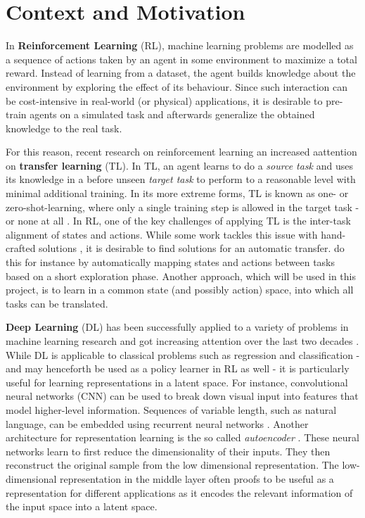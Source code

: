 \section{Context and Motivation}
\label{sec:context}

In \textbf{Reinforcement Learning} (RL), machine learning problems are modelled as a sequence of actions taken by an agent in some environment to maximize a total reward. Instead of learning from a dataset, the agent builds knowledge about the environment by exploring the effect of its behaviour. Since such interaction can be cost-intensive in real-world (or physical) applications, it is desirable to pre-train agents on a simulated task and afterwards generalize the obtained knowledge to the real task. 

For this reason, recent research on reinforcement learning an increased aattention on \textbf{transfer learning} (TL). In TL, an agent learns to do a \textit{source task} and uses its knowledge in a before unseen \textit{target task} to perform to a reasonable level with minimal additional training. In its more extreme forms, TL is known as one- or zero-shot-learning, where only a single training step is allowed in the target task - or none at all \citep{goodfellow2016deep}. In RL, one of the key challenges of applying TL is the inter-task alignment of states and actions. While some work tackles this issue with hand-crafted solutions \citep[e.g.][]{taylor2007cross}, it is desirable to find solutions for an automatic transfer. \citep{taylor2008autonomous} do this for instance by automatically mapping states and actions between tasks based on a short exploration phase. Another approach, which will be used in this project, is to learn in a common state (and possibly action) space, into which all tasks can be translated.

\textbf{Deep Learning} (DL) has been successfully applied to a variety of problems in machine learning research and got increasing attention over the last two decades \citep{goodfellow2016deep}. While DL is applicable to classical problems such as regression and classification - and may henceforth be used as a policy learner in RL as well - it is particularly useful for learning representations in a latent space. For instance, convolutional neural networks (CNN) can be used to break down visual input into features that model higher-level information. Sequences of variable length, such as natural language, can be embedded using recurrent neural networks \citep{goldberg2017neural}. Another architecture for representation learning is the so called \textit{autoencoder} \citep{hinton2006reducing}. These neural networks learn to first reduce the dimensionality of their inputs. They then reconstruct the original sample from the low dimensional representation. The low-dimensional representation in the middle layer often proofs to be useful as a representation for different applications as it encodes the relevant information of the input space into a latent space. 

